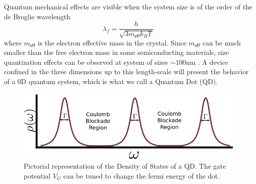 Quantum mechanical effects are visible when the system size is of the order of the de Broglie wavelength \citep[(1.1)]{bimberg_quantum_1999}
\[
\lambda_{f}=\frac{h}{\sqrt{3m_{\mathsf{eff}}k_{B}T}}
\]
 where $m_{\mathsf{eff}}$ is the electron effective mass in the crystal.
Since $m_{\mathsf{eff}}$ can be much smaller than the free electron mass in some semiconducting materials, size quantization effects can be observed at system of sizes $\sim100\mbox{nm}$ \citep[2.1]{sindel_numerical_2005}. A device confined in the three dimensions up to this length-scale will present the behavior of a $0$D quantum system, which is what we call a Quantum Dot (QD).\\

\begin{figure}[tb]
    \centering
    \includegraphics[scale=0.5]{IMAGES/Preliminars/specDot.png}
    \caption{Pictorial representation of the Density of States of a QD. The gate potential $V_G$ can be tuned to change the fermi energy of the dot.  \protect{} }
    \label{fig:specDots}
\end{figure}


